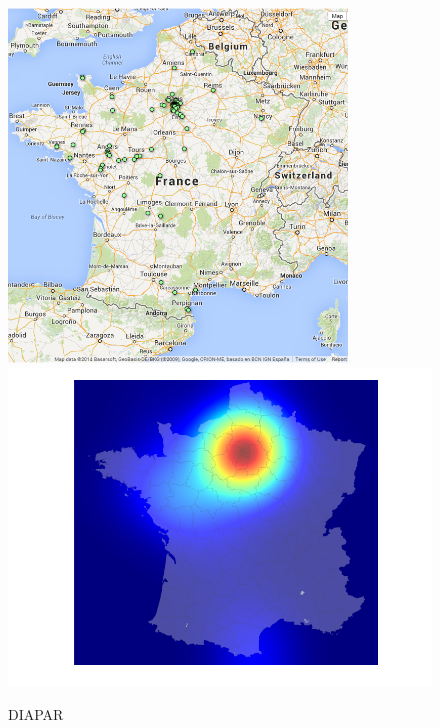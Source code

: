 \documentclass[11pt]{article}
\begin{document}
\begin{figure}[H]
    \caption{DIAPAR}
	\centering
		\includegraphics[width=9cm]{images/maps_group_dots/DIAPAR.png}
        \includegraphics[width=12.8cm]{images/maps_group_heatmaps/DIAPAR.png}
\end{figure}
\end{document}
